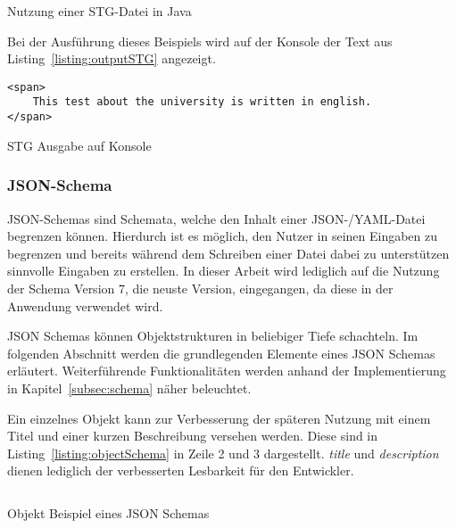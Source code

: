 \begin{listing}[!ht]
    \inputminted{java}{listings/2.2.1/JavaSTGExample.java}
    \caption{Nutzung einer STG-Datei in Java}
    \label{listing:stgJavaFile}
\end{listing}

Bei der Ausführung dieses Beispiels wird auf der Konsole der Text aus Listing~\ref{listing:outputSTG} angezeigt.

\begin{listing}[!ht]
    \begin{verbatim}
<span>
    This test about the university is written in english.
</span>
    \end{verbatim}
    \caption{STG Ausgabe auf Konsole}
    \label{listing:outputSTG}
\end{listing}

\subsubsection{JSON-Schema}\label{subsubsec:json-schema}
JSON-Schemas sind Schemata, welche den Inhalt einer JSON-/YAML-Datei begrenzen können.
Hierdurch ist es möglich, den Nutzer in seinen Eingaben zu begrenzen und bereits während dem Schreiben einer Datei dabei zu unterstützen sinnvolle Eingaben zu erstellen.
In dieser Arbeit wird lediglich auf die Nutzung der Schema Version 7, die neuste Version, eingegangen, da diese in der Anwendung verwendet wird.

JSON Schemas können Objektstrukturen in beliebiger Tiefe schachteln.
Im folgenden Abschnitt werden die grundlegenden Elemente eines JSON Schemas erläutert.
Weiterführende Funktionalitäten werden anhand der Implementierung in Kapitel~\ref{subsec:schema} näher beleuchtet.

Ein einzelnes Objekt kann zur Verbesserung der späteren Nutzung mit einem Titel und einer kurzen Beschreibung versehen werden.
Diese sind in Listing~\ref{listing:objectSchema} in Zeile 2 und 3 dargestellt.
\textit{title} und \textit{description} dienen lediglich der verbesserten Lesbarkeit für den Entwickler.

\begin{listing}[!ht]
    \inputminted{json}{listings/2.2.1/object.schema.json}
    \caption{Objekt Beispiel eines JSON Schemas}
    \label{listing:objectSchema}
\end{listing}

